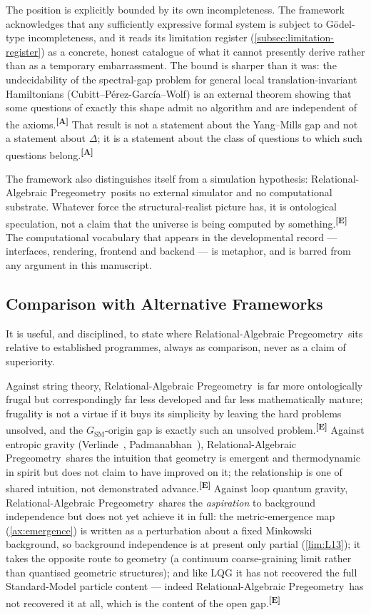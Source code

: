 \documentclass[12pt,a4paper,twoside]{article}
\theoremstyle{plain}
\theoremstyle{definition}
\theoremstyle{remark}
\newcommand{\ProjectShort}{Relational-Algebraic Pregeometry}
\newcommand{\RAP}{\ProjectShort}
\newcommand{\catmark}[1]{\textsuperscript{\textsf{\textbf{[#1]}}}}
\begin{document}
The position is explicitly bounded by its own incompleteness. The
framework acknowledges that any sufficiently expressive formal system is
subject to G\"odel-type incompleteness, and it reads its limitation
register (\cref{subsec:limitation-register}) as a concrete, honest
catalogue of what it cannot presently derive rather than as a temporary
embarrassment. The bound is sharper than it was: the undecidability of
the spectral-gap problem for general local translation-invariant
Hamiltonians (Cubitt--P\'erez-Garc\'ia--Wolf) is an external theorem
showing that some questions of exactly this shape admit no algorithm and
are independent of the axioms.\catmark{A} That result is not a statement
about the Yang--Mills gap and not a statement about $\Delta$; it is a
statement about the class of questions to which such questions
belong.\catmark{A}

The framework also distinguishes itself from a simulation hypothesis:
\RAP\ posits no external simulator and no computational substrate.
Whatever force the structural-realist picture has, it is ontological
speculation, not a claim that the universe is being computed by
something.\catmark{E} The computational vocabulary that appears in the
developmental record --- interfaces, rendering, frontend and backend ---
is metaphor, and is barred from any argument in this manuscript.

\subsection{Comparison with Alternative Frameworks}
\label{subsec:alt-frameworks}

It is useful, and disciplined, to state where \RAP\ sits relative to
established programmes, always as comparison, never as a claim of
superiority.

Against string theory, \RAP\ is far more ontologically frugal but
correspondingly far less developed and far less mathematically mature;
frugality is not a virtue if it buys its simplicity by leaving the hard
problems unsolved, and the $G_{\mathrm{SM}}$-origin gap is exactly such
an unsolved problem.\catmark{E} Against entropic gravity
(Verlinde~\cite{verlinde2011}, Padmanabhan~\cite{padmanabhan2010}),
\RAP\ shares the intuition that geometry is emergent and thermodynamic
in spirit but does not claim to have improved on it; the relationship is
one of shared intuition, not demonstrated advance.\catmark{E} Against
loop quantum gravity, \RAP\ shares the \emph{aspiration} to background
independence but does not yet achieve it in full: the metric-emergence
map (\cref{ax:emergence}) is written as a perturbation about a fixed
Minkowski background, so background independence is at present only
partial (\cref{lim:L13}); it takes the opposite route to geometry (a
continuum coarse-graining limit rather than quantised geometric
structures); and like LQG it has not recovered the full Standard-Model
particle content --- indeed \RAP\ has not recovered it at all, which is
the content of the open gap.\catmark{E}
\end{document}
